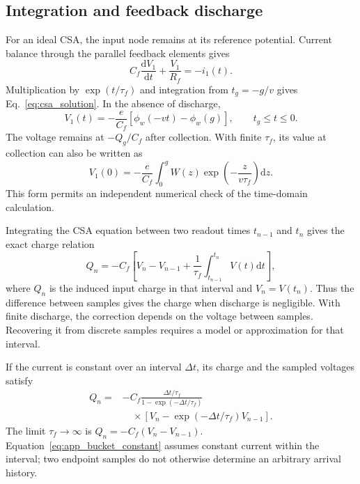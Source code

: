 \documentclass[pdflatex,iicol,sn-mathphys-num]{sn-jnl}
\newcommand{\dd}{\mathrm{d}}
\begin{document}
\subsection{Integration and feedback discharge}

For an ideal CSA, the input node remains at its reference potential. Current balance through the parallel feedback elements gives
\begin{equation}
 C_f\frac{\dd V_1}{\dd t}+\frac{V_1}{R_f}=-i_1(t).
\end{equation}
Multiplication by $\exp(t/\tau_f)$ and integration from $t_g=-g/v$ gives Eq.~\eqref{eq:csa_solution}. In the absence of discharge,
\begin{equation}
 V_1(t)=-\frac{e}{C_f}[\phi_w(-vt)-\phi_w(g)],
 \qquad t_g\leq t\leq0.
\end{equation}
The voltage remains at $-Q_g/C_f$ after collection. With finite $\tau_f$, its value at collection can also be written as
\begin{equation}
 V_1(0)=-\frac{e}{C_f}\int_0^g W(z)
 \exp\left(-\frac{z}{v\tau_f}\right)\dd z.
 \label{eq:app_csa_quadrature}
\end{equation}
This form permits an independent numerical check of the time-domain calculation.

Integrating the CSA equation between two readout times $t_{n-1}$ and $t_n$ gives the exact charge relation
\begin{equation}
 Q_n=-C_f\left[V_n-V_{n-1}
 +\frac{1}{\tau_f}\int_{t_{n-1}}^{t_n}V(t)\dd t\right],
 \label{eq:app_bucket_charge}
\end{equation}
where $Q_n$ is the induced input charge in that interval and $V_n=V(t_n)$. Thus the difference between samples gives the charge when discharge is negligible. With finite discharge, the correction depends on the voltage between samples. Recovering it from discrete samples requires a model or approximation for that interval.

If the current is constant over an interval $\Delta t$, its charge and the sampled voltages satisfy
\begin{equation}
 \begin{aligned}
 Q_n={}&-C_f\frac{\Delta t/\tau_f}{1-\exp(-\Delta t/\tau_f)}\\
 &\quad\times\left[V_n-\exp(-\Delta t/\tau_f)V_{n-1}\right].
 \end{aligned}
 \label{eq:app_bucket_constant}
\end{equation}
The limit $\tau_f\to\infty$ is $Q_n=-C_f(V_n-V_{n-1})$. Equation~\eqref{eq:app_bucket_constant} assumes constant current within the interval; two endpoint samples do not otherwise determine an arbitrary arrival history.
\end{document}
